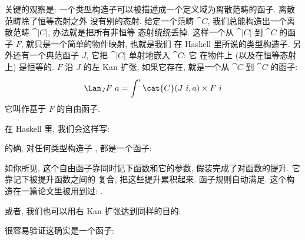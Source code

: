 关键的观察是: 一个类型构造子可以被描述成一个定义域为离散范畴的函子. 离散范畴除了恒等态射之外
没有别的态射. 给定一个范畴 $\cat{C}$, 我们总能构造出一个离散范畴 $\cat{|C|}$, 办法就是把所有非恒等
态射统统丢掉. 这样一个从 $\cat{|C|}$ 到 $\cat{C}$ 的函子 $F$, 就只是一个简单的物件映射, 也就是我们
在 Haskell 里所说的类型构造子. 另外还有一个典范函子 $J$, 它把 $\cat{|C|}$ 单射地嵌入 $\cat{C}$: 它
在物件上 (以及在恒等态射上) 是恒等的. $F$ 沿 $J$ 的左 Kan 扩张, 如果它存在, 就是一个从 $\cat{C}$
到 $\cat{C}$ 的函子:
\[\Lan_{J}F\ a = \int^i \cat{C}(J\ i, a)\times{}F\ i\]
它叫作基于 $F$ 的自由函子.

在 Haskell 里, 我们会这样写:

的确, 对任何类型构造子 ,  都是一个函子:

如你所见, 这个自由函子靠同时记下函数和它的参数, 假装完成了对函数的提升. 它靠记下被提升函数之间的
复合, 把这些提升累积起来. 函子规则自动满足. 这个构造在一篇论文里被用到过:
.

或者, 我们也可以用右 Kan 扩张达到同样的目的:

很容易验证这确实是一个函子:

